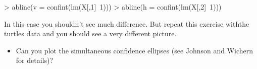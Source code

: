\documentclass[11pt]{article}
\begin{document}
\begin{Schunk}
\begin{Sinput}
> abline(v = confint(lm(X[,1]~1)))
> abline(h = confint(lm(X[,2]~1)))
\end{Sinput}
\end{Schunk}

In this case you shouldn't see much difference.   But repeat this exercise withthe turtles data and you should see a very different picture.

\begin{itemize}
\item Can you plot the simultaneous confidence ellipses (see Johnson and Wichern for details)?
\end{itemize}

\end{document}
